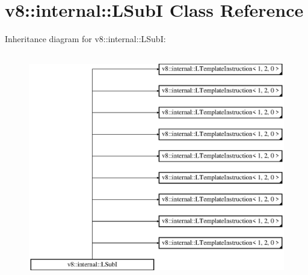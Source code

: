 \hypertarget{classv8_1_1internal_1_1_l_sub_i}{}\section{v8\+:\+:internal\+:\+:L\+SubI Class Reference}
\label{classv8_1_1internal_1_1_l_sub_i}
Inheritance diagram for v8\+:\+:internal\+:\+:L\+SubI\+:\begin{figure}[H]
\begin{center}
\leavevmode
\includegraphics[height=10.000000cm]{classv8_1_1internal_1_1_l_sub_i}
\end{center}
\end{figure}
